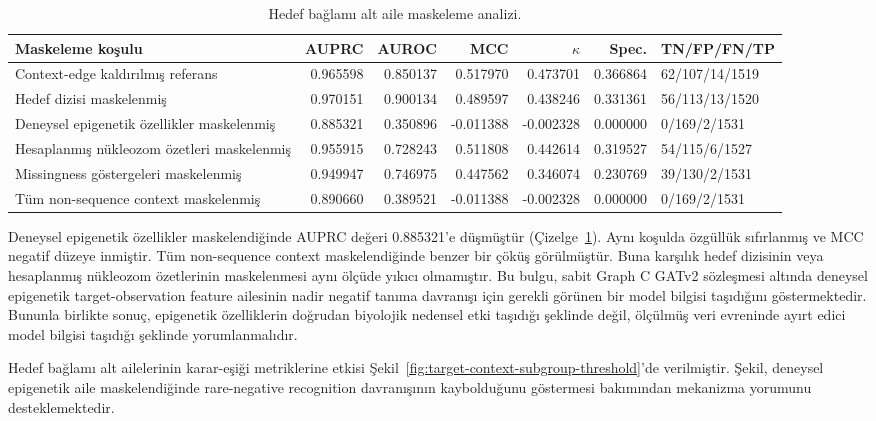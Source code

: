 \begin{table}[htbp]
\caption{Hedef bağlamı alt aile maskeleme analizi.}
\label{tab:target-context-mask}
\centering
\scriptsize
\begin{tabularx}{\textwidth}{>{\raggedright\arraybackslash}X r r r r r l}
\toprule\toprule
Maskeleme koşulu & AUPRC & AUROC & MCC & $\kappa$ & Spec. & TN/FP/FN/TP\\
\midrule
Context-edge kaldırılmış referans & 0.965598 & 0.850137 & 0.517970 & 0.473701 & 0.366864 & 62/107/14/1519\\
Hedef dizisi maskelenmiş & 0.970151 & 0.900134 & 0.489597 & 0.438246 & 0.331361 & 56/113/13/1520\\
Deneysel epigenetik özellikler maskelenmiş & 0.885321 & 0.350896 & -0.011388 & -0.002328 & 0.000000 & 0/169/2/1531\\
Hesaplanmış nükleozom özetleri maskelenmiş & 0.955915 & 0.728243 & 0.511808 & 0.442614 & 0.319527 & 54/115/6/1527\\
Missingness göstergeleri maskelenmiş & 0.949947 & 0.746975 & 0.447562 & 0.346074 & 0.230769 & 39/130/2/1531\\
Tüm non-sequence context maskelenmiş & 0.890660 & 0.389521 & -0.011388 & -0.002328 & 0.000000 & 0/169/2/1531\\
\bottomrule
\end{tabularx}
\end{table}

Deneysel epigenetik özellikler maskelendiğinde AUPRC değeri 0.885321'e düşmüştür (Çizelge~\ref{tab:target-context-mask}). Aynı koşulda özgüllük sıfırlanmış ve MCC negatif düzeye inmiştir. Tüm non-sequence context maskelendiğinde benzer bir çöküş görülmüştür. Buna karşılık hedef dizisinin veya hesaplanmış nükleozom özetlerinin maskelenmesi aynı ölçüde yıkıcı olmamıştır. Bu bulgu, sabit Graph C GATv2 sözleşmesi altında deneysel epigenetik target-observation feature ailesinin nadir negatif tanıma davranışı için gerekli görünen bir model bilgisi taşıdığını göstermektedir. Bununla birlikte sonuç, epigenetik özelliklerin doğrudan biyolojik nedensel etki taşıdığı şeklinde değil, ölçülmüş veri evreninde ayırt edici model bilgisi taşıdığı şeklinde yorumlanmalıdır.

Hedef bağlamı alt ailelerinin karar-eşiği metriklerine etkisi Şekil~\ref{fig:target-context-subgroup-threshold}'de verilmiştir. Şekil, deneysel epigenetik aile maskelendiğinde rare-negative recognition davranışının kaybolduğunu göstermesi bakımından mekanizma yorumunu desteklemektedir.

